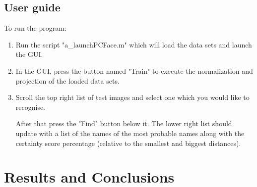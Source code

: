 \documentclass[12pt,a4paper,titlepage]{article}
\begin{document}
\subsection{User guide}
	To run the program:
	\begin{enumerate}
		\item Run the script "a\_launchPCFace.m" which will load the data sets and launch the GUI.
		\item In the GUI, press the button named "Train" to execute the normalization and projection of the loaded data sets.
		\item Scroll the top right list of test images and select one which you would like to recognise. 
		
		After that press the "Find" button below it. The lower right list should update with a list of the names of the most probable names along with the certainty score percentage (relative to the smallest and biggest distances).
	\end{enumerate}
	 
	
\section{Results and Conclusions}
\end{document}
